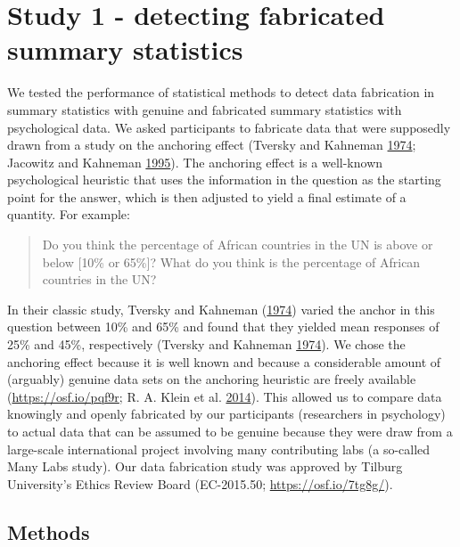\documentclass[a5paper]{book}
\begin{document}
\section{Study 1 - detecting fabricated summary
statistics}\label{study-1---detecting-fabricated-summary-statistics}

We tested the performance of statistical methods to detect data
fabrication in summary statistics with genuine and fabricated summary
statistics with psychological data. We asked participants to fabricate
data that were supposedly drawn from a study on the anchoring effect
(Tversky and Kahneman
\protect\hyperlink{ref-doi:10.1126ux2fscience.185.4157.1124}{1974};
Jacowitz and Kahneman
\protect\hyperlink{ref-doi:10.1037ux2fe722982011-058}{1995}). The
anchoring effect is a well-known psychological heuristic that uses the
information in the question as the starting point for the answer, which
is then adjusted to yield a final estimate of a quantity. For example:

\begin{quote}
Do you think the percentage of African countries in the UN is above or
below {[}10\% or 65\%{]}? What do you think is the percentage of African
countries in the UN?
\end{quote}

In their classic study, Tversky and Kahneman
(\protect\hyperlink{ref-doi:10.1126ux2fscience.185.4157.1124}{1974})
varied the anchor in this question between 10\% and 65\% and found that
they yielded mean responses of 25\% and 45\%, respectively (Tversky and
Kahneman
\protect\hyperlink{ref-doi:10.1126ux2fscience.185.4157.1124}{1974}). We
chose the anchoring effect because it is well known and because a
considerable amount of (arguably) genuine data sets on the anchoring
heuristic are freely available (\url{https://osf.io/pqf9r}; R. A. Klein
et al.
\protect\hyperlink{ref-doi:10.1027ux2f1864-9335ux2fa000178}{2014}). This
allowed us to compare data knowingly and openly fabricated by our
participants (researchers in psychology) to actual data that can be
assumed to be genuine because they were draw from a large-scale
international project involving many contributing labs (a so-called Many
Labs study). Our data fabrication study was approved by Tilburg
University's Ethics Review Board (EC-2015.50;
\url{https://osf.io/7tg8g/}).

\subsection{Methods}\label{methods-2}
\end{document}
